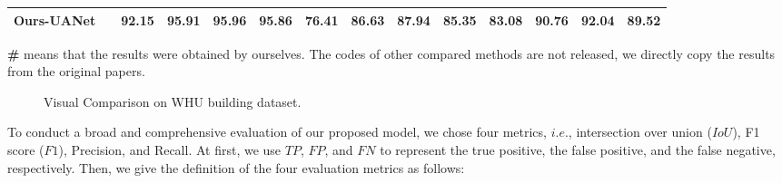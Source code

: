 \documentclass[lettersize,journal]{IEEEtran}
\begin{document}
\begin{table*}[]
\begin{tabular}{c|c|cccc|cccc|cccc}
\textbf{Ours-UANet} &  &
\color{red}\textbf{92.15} &{\color{red}\textbf{95.91}} &{\color{red}\textbf{95.96}} &\color{red}\textbf{95.86}

& \color{red}\textbf{{76.41}} &\color{red}\textbf{{86.63}} &\color{red}\textbf{87.94} &\color{red}\textbf{{85.35}}

& {\color{red}\textbf{83.08}} &{\color{red}\textbf{90.76}} &{\color{red}\textbf{92.04}} &{\color{red}\textbf{89.52}}
\\ \hline
\end{tabular}

{\textbf{\#} means that the results were obtained by ourselves. The codes of other compared methods are not released, we directly copy the results from the original papers. }
\vspace{-1.0em}
\end{table*}


\begin{figure*}
\centering
{}
\hfil
{}
\hfil
{}
\hfil
{}
\hfil
{}
\hfil
{}
\hfil
{}
\hfil
\caption{Visual Comparison on WHU building dataset.}
\label{fig_tp_whu}
\vspace{-0.5em}
\end{figure*}

To conduct a broad and comprehensive evaluation of our proposed model, we chose four metrics, $i.e.$, intersection over union ($IoU$), F1 score ($F1$), Precision, and Recall. At first, we use $TP$, $FP$, and $FN$ to represent the true positive, the false positive, and the false negative, respectively. Then, we give the definition of the four evaluation metrics as follows:
\end{document}
